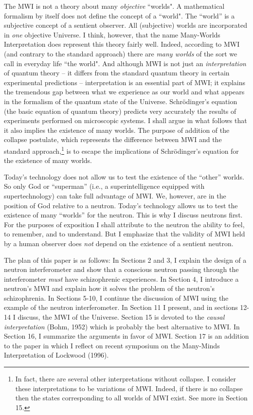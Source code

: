 \documentclass[12pt]{article}
\begin{document}
The MWI is not a theory about many {\it objective} ``worlds".  A
mathematical formalism by itself does not define the concept of a
``world".  The ``world'' is a subjective concept of a sentient
observer.  All (subjective) worlds are incorporated in {\it one}
objective Universe.  I think, however, that the name Many-Worlds
Interpretation does represent this theory fairly well.  Indeed,
according to MWI (and contrary to the standard approach) there are
{\it many worlds} of the sort we call in everyday life ``the world".
And although MWI is not just an {\it interpretation} of quantum theory
-- it differs from the standard quantum theory in certain experimental
predictions -- interpretation is an essential part of MWI; it explains
the tremendous gap between what we experience as our world and what
appears in the formalism of the quantum state of the Universe.
Schr\"odinger's equation (the basic equation of quantum theory)
predicts very accurately the results of experiments performed on
microscopic systems.  I shall argue in what follows that it also
implies the existence of many worlds.  The purpose of addition of the
collapse postulate, which represents the difference between MWI and
the standard approach,\footnote{In fact, there are several other
  interpretations without collapse.  I consider these interpretations
  to be variations of MWI. Indeed, if there is no collapse then the
  states corresponding to all worlds of MWI exist.  See more in
  Section 15.} is to escape the implications of Schr\"odinger's
equation for the existence of many worlds.

Today's technology does not allow us to test the existence of the
``other'' worlds.  So only God or ``superman'' (i.e., a
superintelligence equipped with supertechnology) can take full
advantage of MWI. We, however, are in the position of God relative to
a neutron.  Today's technology allows us to test the existence of many
``worlds'' for the neutron.  This is why I discuss neutrons first.
For the purposes of exposition I shall attribute to the neutron the
ability to feel, to remember, and to understand.  But I emphasize that
the validity of MWI held by a human observer does {\it not} depend on
the existence of a sentient neutron.

The plan of this paper is as follows: In Sections 2 and 3, I explain
the design of a neutron interferometer and show that a conscious
neutron passing through the interferometer {\it must} have
schizophrenic experiences.  In Section 4, I introduce a neutron's MWI
and explain how it solves the problem of the neutron's schizophrenia.
In Sections 5-10, I continue the discussion of MWI using the example
of the neutron interferometer.  In Section 11 I present, and in
sections 12-14 I discuss, the MWI of the Universe. Section 15 is
devoted to the {\it causal interpretation} (Bohm, 1952) which is
probably the best alternative to MWI.  In Section 16, I summarize the
arguments in favor of MWI. Section 17 is an addition to the paper in
which I reflect on recent symposium on the Many-Minds Interpretation
of Lockwood (1996).
 
\end{document}
